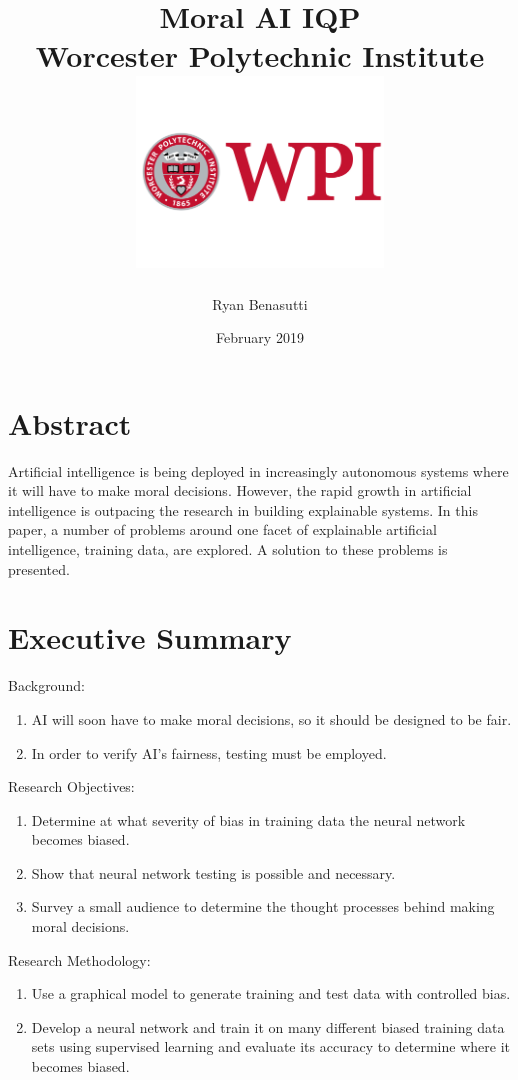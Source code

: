 \documentclass{report}
\title{
    {Moral AI IQP}\\
    {\large Worcester Polytechnic Institute}\\
    {\includegraphics[height=2in]{WPI_Inst_Prim_FulClr.png}}
}
\author{Ryan Benasutti}
\date{February 2019}
\begin{document}
\maketitle

\clearpage
\mbox{}
\clearpage

\chapter*{Abstract}

Artificial intelligence is being deployed in increasingly autonomous systems where it will have to
make moral decisions. However, the rapid growth in artificial intelligence is outpacing the
research in building explainable systems. In this paper, a number of problems around one facet of
explainable artificial intelligence, training data, are explored. A solution to these problems is
presented.

\chapter*{Executive Summary}

Background:
\begin{enumerate}
    \item AI will soon have to make moral decisions, so it should be designed to be fair.
    \item In order to verify AI's fairness, testing must be employed.
\end{enumerate}

Research Objectives:
\begin{enumerate}
    \item Determine at what severity of bias in training data the neural network becomes biased.
    \item Show that neural network testing is possible and necessary.
    \item Survey a small audience to determine the thought processes behind making moral decisions.
\end{enumerate}

Research Methodology:
\begin{enumerate}
    \item Use a graphical model to generate training and test data with controlled bias.
    
    \item Develop a neural network and train it on many different biased training data sets using
    supervised learning and evaluate its accuracy to determine where it becomes biased.
\end{enumerate}
\end{document}
